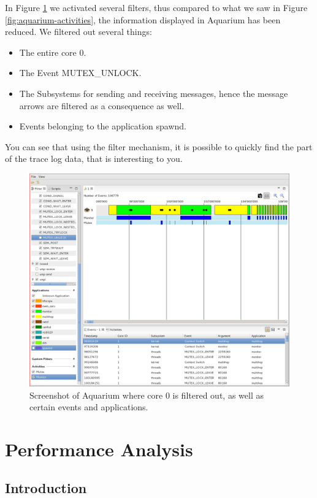 \documentclass[a4paper,11pt,twoside]{report}
\begin{document}
In Figure \ref{fig:aquarium-filters} we activated several filters, thus compared
to what we saw in Figure \ref{fig:aquarium-activities}, the information
displayed in Aquarium has been reduced. We filtered out several things:

\begin{itemize}
	\item The entire core 0.
	\item The Event MUTEX\_UNLOCK.
	\item The Subsystems for sending and receiving messages, hence the message
		arrows are filtered as a consequence as well.
	\item Events belonging to the application spawnd.
\end{itemize}

You can see that using the filter mechanism, it is possible to quickly find the
part of the trace log data, that is interesting to you.

\begin{figure}[htb]
	\includegraphics[width=1\textwidth]{images/aquarium-filters.png}
	\caption{Screenshot of Aquarium where core 0 is filtered out, as well as
	certain events and applications.}
	\label{fig:aquarium-filters}
\end{figure}

\chapter{Performance Analysis}

\section{Introduction}
\end{document}
